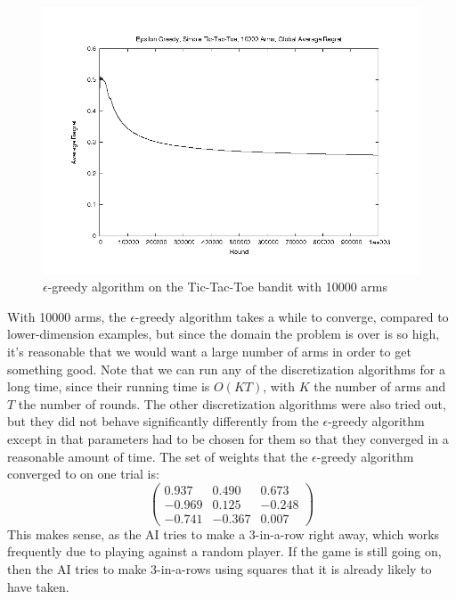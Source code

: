 \begin{figure}[!ht]
  \begin{center}
    \includegraphics[width=\figwidth]{data/tictactoe/egtoe10000_GA.png}
     \caption{$\epsilon$-greedy algorithm on the Tic-Tac-Toe bandit with
     10000 arms}
     \label{fig:egtoe}
  \end{center}
\end{figure}

With 10000 arms, the $\epsilon$-greedy algorithm takes a while to
converge, compared to lower-dimension examples, but since the domain
the problem is over is so high, it's reasonable that we would want a
large number of arms in order to get something good.  Note that we can
run any of the discretization algorithms for a long time, since their
running time is $O(KT)$, with $K$ the number of arms and $T$ the
number of rounds.  The other discretization algorithms were also tried
out, but they did not behave significantly differently from the
$\epsilon$-greedy algorithm except in that parameters had to be chosen
for them so that they converged in a reasonable amount of time.  The
set of weights that the $\epsilon$-greedy algorithm converged to
on one trial is:
\[
\left(
\begin{array}{ccc}
0.937 & 0.490 & 0.673 \\
-0.969 & 0.125 & -0.248 \\
-0.741 & -0.367 & 0.007
\end{array}
\right)
\]
This makes sense, as the AI tries to make a 3-in-a-row right away,
which works frequently due to playing against a random player.  If the
game is still going on, then the AI tries to make 3-in-a-rows using
squares that it is already likely to have taken.

